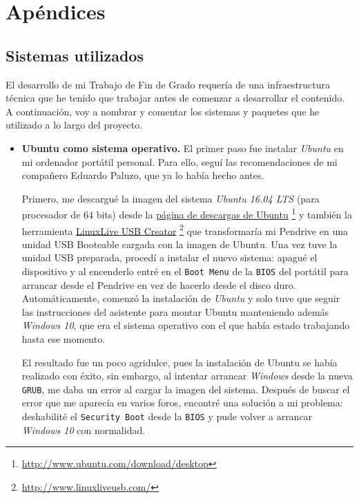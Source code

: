 \chapter{Apéndices}

\section {Sistemas utilizados}

El desarrollo de mi Trabajo de Fin de Grado requería de una infraestructura
técnica que he tenido que trabajar antes de comenzar a desarrollar el contenido.
A continuación, voy a nombrar y comentar los sistemas y paquetes que he utilizado 
a lo largo del proyecto. 

\begin{itemize}
  \item \textbf{Ubuntu como sistema operativo.} El primer paso fue instalar
    \textit{Ubuntu} en mi ordenador portátil personal. Para ello, seguí las 
    recomendaciones de mi compañero Eduardo Paluzo, que ya lo había hecho antes. 

    Primero, me descargué la imagen del sistema \textit{Ubuntu 16.04 LTS} (para 
    procesador de 64 bits) desde la 
    \href{http://www.ubuntu.com/download/desktop}
    {página de descargas de Ubuntu}
    \footnote{\url{http://www.ubuntu.com/download/desktop}} y también la herramienta 
    \href{http://www.linuxliveusb.com/}
    {LinuxLive USB Creator}
    \footnote{\url{http://www.linuxliveusb.com/}} que transformaría mi Pendrive en 
    una unidad USB Booteable cargada con la imagen de Ubuntu. Una vez tuve la unidad
    USB preparada, procedí a instalar el nuevo sistema: apagué el dispositivo y al 
    encenderlo entré en el  \texttt{Boot Menu} de la  \texttt{BIOS} del portátil 
    para arrancar desde el Pendrive en vez de hacerlo desde el disco duro. 
    Automáticamente, comenzó la instalación de  \textit{Ubuntu} y solo tuve que seguir 
    las instrucciones del asistente para montar Ubuntu manteniendo además  
    \textit{Windows 10}, que era el sistema operativo con el que había estado trabajando 
    hasta ese momento.
    
    El resultado fue un poco agridulce, pues la instalación de Ubuntu se había realizado
    con éxito, sin embargo, al intentar arrancar  \textit{Windows} desde la nueva 
     \texttt{GRUB}, me daba un error al cargar la imagen del sistema. Después de buscar 
    el error que me aparecía en varios foros, encontré una solución a mi problema: 
    deshabilité el  \texttt{Security Boot} desde la  \texttt{BIOS} y pude volver a 
    arrancar  \textit{Windows 10} con normalidad.


\end{itemize}
